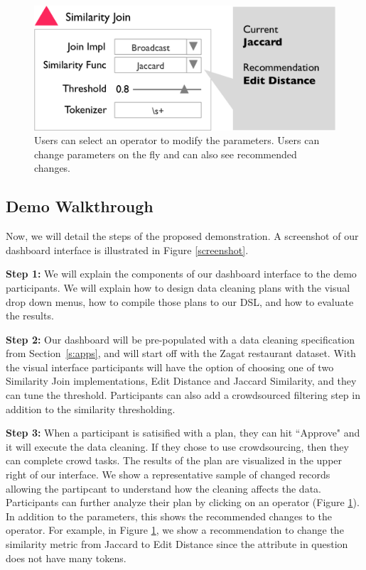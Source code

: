 \begin{figure}[t]
\centering
 \includegraphics[width=\columnwidth]{figs/dashboard_recsys.png}
 \caption{Users can select an operator to modify the parameters. Users can change parameters on the fly and can also see recommended changes. \label{screenshot-rec}}\vspace{-1.75em}
\end{figure}

\subsection{Demo Walkthrough}
Now, we will detail the steps of the proposed demonstration.
A screenshot of our dashboard interface is illustrated in Figure \ref{screenshot}.

\vspace{0.5em}

\noindent\textbf{Step 1: } We will explain the components of our dashboard interface to the
demo participants. We will explain how to design data cleaning plans with the visual 
drop down menus, how to compile those plans to our DSL, and how to evaluate the results.

\vspace{0.5em}

\noindent\textbf{Step 2: } Our dashboard will be pre-populated with a data cleaning specification from Section~\ref{s:apps}, and will
start off with the Zagat restaurant dataset. With the visual interface participants will have the option of choosing one of two Similarity Join implementations, Edit Distance and Jaccard Similarity, and they can tune the threshold.
Participants can also add a crowdsourced filtering step in addition to the similarity thresholding. 

\vspace{0.5em}

\noindent\textbf{Step 3: } When a participant is satisified with a plan, they can hit ``Approve" and it will execute the data cleaning. If they chose to use crowdsourcing, then they can complete crowd tasks. The results of the plan are visualized in the upper right of our interface.
We show a representative sample of changed records allowing the partipcant to understand how the cleaning affects the data. 
Participants can further analyze their plan by clicking on an operator (Figure \ref{screenshot-rec}).
In addition to the parameters, this shows the recommended changes to the operator.
For example, in Figure \ref{screenshot-rec}, we show a recommendation to change the similarity metric from Jaccard to Edit Distance since the attribute in question does not have many tokens.


